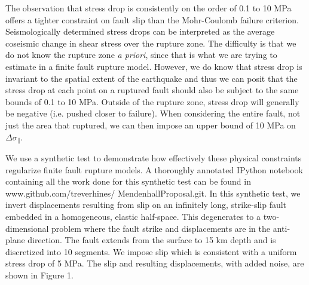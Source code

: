 \documentclass[12pt]{article}
\begin{document}
The observation that stress drop is consistently on the order of 0.1 to 10 MPa offers a tighter constraint on fault slip than the Mohr-Coulomb failure criterion.  Seismologically determined stress drops can be interpreted as the average coseismic change in shear stress over the rupture zone.  The difficulty is that we do not know the rupture zone \textit{a priori}, since that is what we are trying to estimate in a finite fault rupture model.  However, we do know that stress drop is invariant to the spatial extent of the earthquake and thus we can posit that the stress drop at each point on a ruptured fault should also be subject to the same bounds of 0.1 to 10 MPa.  Outside of the rupture zone, stress drop will generally be negative (i.e. pushed closer to failure).  When considering the entire fault, not just the area that ruptured, we can then impose an upper bound of 10 MPa on $\Delta \sigma_\parallel$.  

We use a synthetic test to demonstrate how effectively these physical constraints regularize finite fault rupture models.  A thoroughly annotated IPython notebook containing all the work done for this synthetic test can be found in www.github.com/treverhines/ MendenhallProposal.git.  In this synthetic test, we invert displacements resulting from slip on an infinitely long, strike-slip fault embedded in a homogeneous, elastic half-space.  This degenerates to a two-dimensional problem where the fault strike and displacements are in the anti-plane direction.  The fault extends from the surface to 15 km depth and is discretized into 10 segments.  We impose slip which is consistent with a uniform stress drop of 5 MPa.  The slip and resulting displacements, with added noise, are shown in Figure 1.
\end{document}
